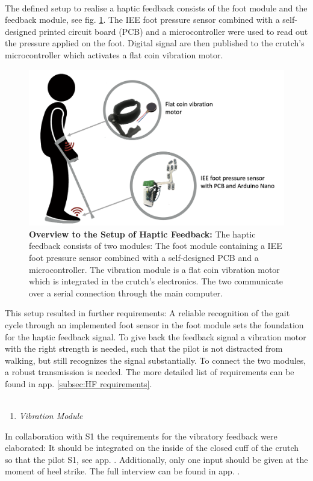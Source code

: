 \documentclass[conference,a4paper]{IEEEtran}
\begin{document}
\\
The defined setup to realise a haptic feedback consists of the foot module and the feedback module, see fig. \ref{Haptic_Feedback_Overview}. The IEE foot pressure sensor combined with a self-designed printed circuit board (PCB) and a microcontroller were used to read out the pressure applied on the foot. Digital signal are then published to the crutch's microcontroller which activates a flat coin vibration motor.\\
\begin{figure}[!t]
	\centering
	\includegraphics[width=1\columnwidth]{Images/Results/Haptic_Feedback_Overview}
	\caption{\textbf{Overview to the Setup of Haptic Feedback:} The haptic feedback consists of two modules: The foot module containing a IEE foot pressure sensor combined with a self-designed PCB and a microcontroller. The vibration module is a flat coin vibration motor which is integrated in the crutch's electronics. The two communicate over a serial connection through the main computer. }
	\label{Haptic_Feedback_Overview}
\end{figure}
This setup resulted in further requirements: A reliable recognition of the gait cycle through an implemented foot sensor in the foot module sets the foundation for the haptic feedback signal. To give back the feedback signal a vibration motor with the right strength is needed, such that the pilot is not distracted from walking, but still recognizes the signal substantially. To connect the two modules, a robust transmission is needed. The more detailed list of requirements can be found in app. \ref{subsec:HF requirements}. \\
\\
\begin{enumerate}[\textit{1)}]
    \item{\textit{Vibration Module}}
\end{enumerate}
In collaboration with S1 the requirements for the vibratory feedback were elaborated: It should be integrated on the inside of the closed cuff of the crutch so that the pilot S1, see app. . Additionally, only one input should be given at the moment of heel strike. The full interview can be found in app. .
\end{document}
